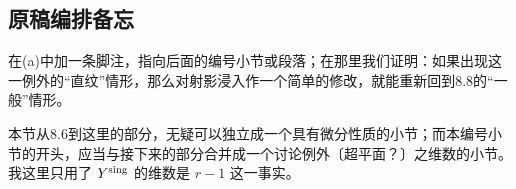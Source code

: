 \subsection*{原稿编排备忘}
在(a)中加一条脚注，指向后面的编号小节或段落；在那里我们证明：如果出现这一例外的“直纹”情形，那么对射影浸入作一个简单的修改，就能重新回到8.8的“一般”情形。

本节从8.6到这里的部分，无疑可以独立成一个具有微分性质的小节；而本编号小节的开头，应当与接下来的部分合并成一个讨论例外〔超平面？〕之维数的小节。我这里只用了 $Y^{\mathrm{sing}}$ 的维数是 $r-1$ 这一事实。
\endgroup
